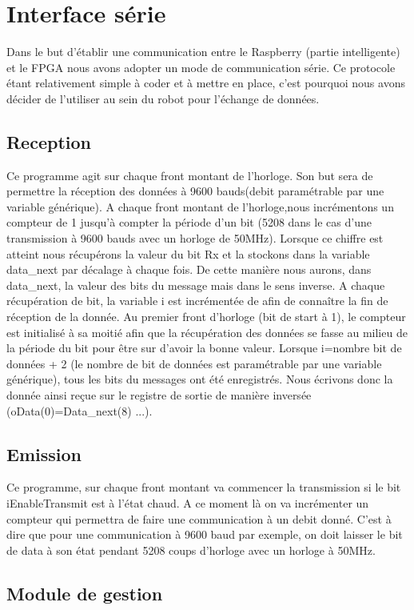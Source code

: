 \section{Interface série}
Dans le but d'établir une communication entre le Raspberry (partie intelligente) et le FPGA nous avons adopter un mode de communication série. Ce protocole étant relativement simple à 
coder et à mettre en place, c'est pourquoi nous avons décider de l'utiliser au sein du robot pour l'échange de données.

\subsection{Reception}
Ce programme agit sur chaque front montant de l'horloge. Son but sera de permettre la réception des
données à 9600 bauds(debit paramétrable par une variable générique).
A chaque front montant de l'horloge,nous incrémentons un compteur
de 1 jusqu'à compter la période d'un bit (5208 dans le cas d'une transmission à 9600 bauds avec un horloge de 50MHz). Lorsque ce chiffre est atteint nous récupérons la
valeur du bit Rx et la stockons dans la variable data\_next par décalage à chaque fois. De cette
manière nous aurons, dans data\_next, la valeur des bits du message mais dans le sens inverse. A
chaque récupération de bit, la variable i est incrémentée de afin de connaître la fin de réception de
la donnée.
Au premier front d'horloge (bit de start à 1), le compteur est initialisé à sa moitié afin que la
récupération des données se fasse au milieu de la période du bit pour être sur d'avoir la bonne
valeur.
Lorsque i=nombre bit de données + 2 (le nombre de bit de données est paramétrable par une variable générique), tous les bits du messages ont été enregistrés.
Nous écrivons donc la donnée ainsi reçue sur le registre de sortie de manière inversée (oData(0)=Data\_next(8) ...).

\subsection{Emission}
Ce programme, sur chaque front montant va commencer la transmission si le bit iEnableTransmit est à l'état chaud. A ce moment là on va incrémenter un compteur qui
permettra de faire une communication à un debit donné. C'est à dire que pour une communication à 9600 baud par exemple, on doit laisser le bit de data à son état 
pendant 5208 coups d'horloge avec un horloge à 50MHz.    

\subsection{Module de gestion}